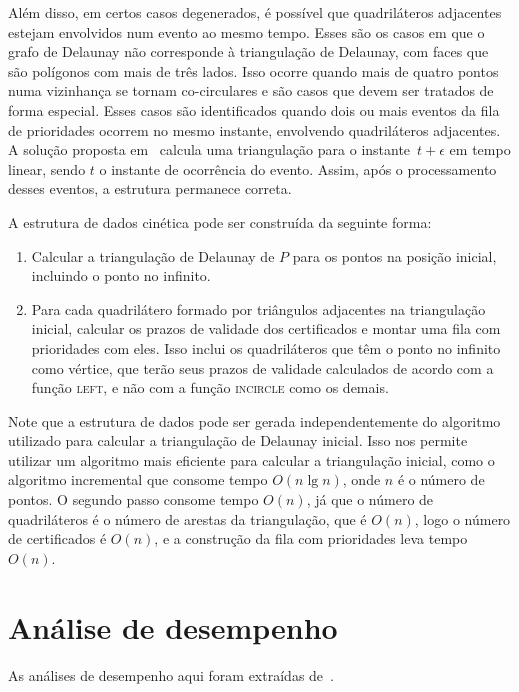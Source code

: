Além disso, em certos casos degenerados, é possível que quadriláteros adjacentes estejam
envolvidos num evento ao mesmo tempo.
Esses são os casos em que o grafo de Delaunay não corresponde à triangulação de Delaunay, com
faces que são polígonos com mais de três lados.
Isso ocorre quando mais de quatro pontos numa vizinhança se tornam co-circulares e são casos que
devem ser tratados de forma especial.
Esses casos são identificados quando dois ou mais eventos da fila de prioridades ocorrem no mesmo
instante, envolvendo quadriláteros adjacentes.
A solução proposta em~\cite{aggarwal-guibas-saxe-shor} calcula uma triangulação para o
instante~$t + \epsilon$ em tempo linear, sendo $t$ o instante de ocorrência do evento.
Assim, após o processamento desses eventos, a estrutura permanece correta.

A estrutura de dados cinética pode ser construída da seguinte forma:
\begin{enumerate}
    \item Calcular a triangulação de Delaunay de $P$ para os pontos na posição inicial, incluindo
    o ponto no infinito.
    \item Para cada quadrilátero formado por triângulos adjacentes na triangulação inicial,
    calcular os prazos de validade dos certificados e montar uma fila com prioridades com eles.
    Isso inclui os quadriláteros que têm o ponto no infinito como vértice, que terão seus prazos
    de validade calculados de acordo com a função \textsc{left}, e não com a função
    \textsc{incircle} como os demais.
\end{enumerate}

Note que a estrutura de dados pode ser gerada independentemente do algoritmo utilizado para
calcular a triangulação de Delaunay inicial.
Isso nos permite utilizar um algoritmo mais eficiente para calcular a triangulação inicial, como o
algoritmo incremental que consome tempo $O(n\lg{n})$, onde $n$ é o número de pontos.
O segundo passo consome tempo $O(n)$, já que o número de quadriláteros é o número de arestas da
triangulação, que é $O(n)$, logo o número de certificados é $O(n)$, e a construção da fila com
prioridades leva tempo $O(n)$.


\section{Análise de desempenho}\label{sec:delaunay:analise-de-desempenho}

As análises de desempenho aqui foram extraídas de~\cite{eduardo}.


